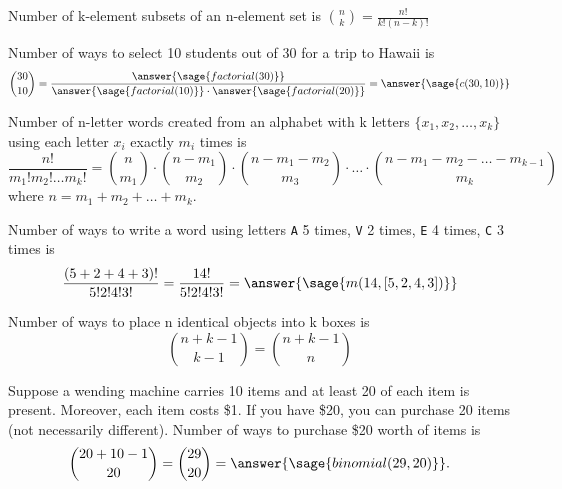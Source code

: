 \documentclass{ximera}
\begin{document}
\begin{theorem}
Number of k-element subsets of an n-element set is $\binom{n}{k}=\frac{n!}{k!(n-k)!}$
\end{theorem}


\begin{example}
Number of ways to select 10 students out of 30 for a trip to Hawaii is  
$$
\binom{30}{10}
=
\frac{\answer{\sage{factorial(30)}}}{\answer{\sage{factorial(10)}}\cdot\answer{\sage{factorial(20)}}}
=
\answer{\sage{c(30,10)}}
$$ 
\end{example}

\begin{theorem}
Number of n-letter words created from an alphabet with k letters $\{x_1,x_2,\ldots, x_k\}$ using each letter $x_i$ exactly $m_i$ times is 
$$\frac{n!}{m_1!m_2!\ldots m_k!}=\binom{n}{m_1}\cdot \binom{n-m_1}{m_2}\cdot \binom{n-m_1-m_2}{m_3}\cdot \ldots \cdot \binom{n-m_1-m_2-\ldots -m_{k-1}}{m_k}$$ 
where $n=m_1+m_2+\ldots+m_k$.
\end{theorem}

\begin{example}
Number of ways to write a word using letters \verb!A! 5 times, \verb!V! 2 times, \verb!E! 4 times, \verb!C! 3 times is 
$$
\frac{(5+2+4+3)!}{5!2!4!3!}
=
\frac{14!}{5!2!4!3!}
=
\answer{\sage{m(14,[5,2,4,3])}}
$$ 
\end{example}

\begin{theorem}
Number of ways to place n identical objects into k boxes  is 
$$
\binom{n+k-1}{k-1}=\binom{n+k-1}{n}
$$
\end{theorem}

\begin{example}
Suppose a wending machine carries 10 items and at least 20 of each item is present. Moreover, each item costs \$1. If you have \$20, you can purchase 20 items (not necessarily different). Number of ways to purchase \$20 worth of items is 
$$
\binom{20+10-1}{20}
=
\binom{29}{20}
=
\answer{\sage{binomial(29,20)}}
.
$$
\end{example}
\end{document}
